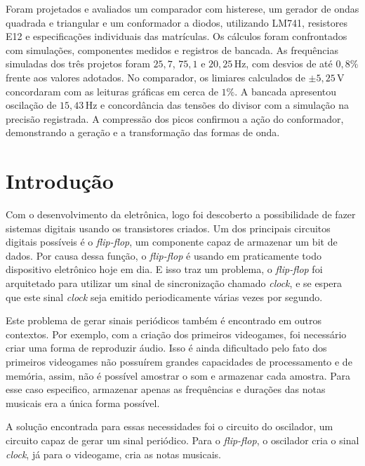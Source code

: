 \documentclass[11pt,a4paper]{article}
\begin{document}
\capa

\begin{resumo}
Foram projetados e avaliados um comparador com histerese, um gerador de
ondas quadrada e triangular e um conformador a diodos, utilizando LM741,
resistores E12 e especificações individuais das matrículas. Os cálculos
foram confrontados com simulações, componentes medidos e registros de
bancada. As frequências simuladas dos três projetos foram $25{,}7$,
$75{,}1$ e $20{,}25\,\mathrm{Hz}$, com desvios de até $0{,}8\%$ frente
aos valores adotados. No comparador, os limiares calculados de
$\pm5{,}25\,\mathrm{V}$ concordaram com as leituras gráficas em cerca de
$1\%$. A bancada apresentou oscilação de $15{,}43\,\mathrm{Hz}$ e
concordância das tensões do divisor com a simulação na precisão
registrada. A compressão dos picos confirmou a ação do conformador,
demonstrando a geração e a transformação das formas de onda.
\end{resumo}

\section{Introdução}

Com o desenvolvimento da eletrônica, logo foi descoberto a possibilidade de fazer sistemas digitais
usando os transistores criados. Um dos principais circuitos digitais possíveis é o \textit{flip-flop},
um componente capaz de armazenar um bit de dados. Por causa dessa função, o \textit{flip-flop} é usando em
praticamente todo dispositivo eletrônico hoje em dia. E isso traz um problema, o \textit{flip-flop} foi
arquitetado para utilizar um sinal de sincronização chamado \textit{clock}, e se espera que este sinal
\textit{clock} seja emitido periodicamente várias vezes por segundo.

Este problema de gerar sinais periódicos também é encontrado em outros contextos. Por exemplo,
com a criação dos primeiros videogames, foi necessário criar uma forma de reproduzir áudio.
Isso é ainda dificultado pelo fato dos primeiros videogames não possuírem grandes capacidades de
processamento e de memória, assim, não é possível amostrar o som e armazenar cada amostra.
Para esse caso especifico, armazenar apenas as frequências e durações das notas musicais era
a única forma possível.

A solução encontrada para essas necessidades foi o circuito do oscilador, um circuito capaz de gerar um sinal
periódico. Para o \textit{flip-flop}, o oscilador cria o sinal \textit{clock}, já para o videogame, cria as notas musicais.
\end{document}
